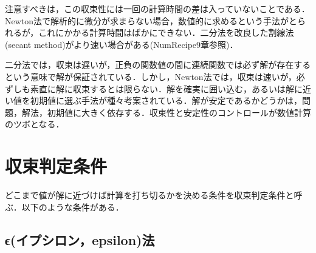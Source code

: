 \documentclass{article}
\begin{document}
\begin{maplegroup}
\begin{mapleinput}
\end{mapleinput}
\mapleresult
\begin{maplelatex}
\end{maplelatex}
\end{maplegroup}
\begin{maplegroup}
\begin{Maple Normal}{
注意すべきは，この収束性には一回の計算時間の差は入っていないことである．Newton法で解析的に微分が求まらない場合，数値的に求めるという手法がとられるが，これにかかる計算時間はばかにできない．二分法を改良した割線法(secant method)がより速い場合がある(NumRecipe9章参照)．}\end{Maple Normal}

\end{maplegroup}
\begin{maplegroup}
\begin{Maple Normal}{
二分法では，収束は遅いが，正負の関数値の間に連続関数では必ず解が存在するという意味で解が保証されている．しかし，Newton法では，収束は速いが，必ずしも素直に解に収束するとは限らない．解を確実に囲い込む，あるいは解に近い値を初期値に選ぶ手法が種々考案されている．解が安定であるかどうかは，問題，解法，初期値に大きく依存する．収束性と安定性のコントロールが数値計算のツボとなる．}\end{Maple Normal}

\end{maplegroup}
\section{\textbf{収束判定条件}}
\begin{maplegroup}
\begin{Maple Normal}{
どこまで値が解に近づけば計算を打ち切るかを決める条件を収束判定条件と呼ぶ．以下のような条件がある．}\end{Maple Normal}

\end{maplegroup}
\subsection{\textbf{ϵ(イプシロン，epsilon)法}}
\begin{maplelatex}\begin{Maple Normal}{
}\end{Maple Normal}
\end{maplelatex}
\begin{maplelatex}\begin{Maple Normal}{
}\end{Maple Normal}
\end{maplelatex}
\begin{maplelatex}\begin{Maple Normal}{
}\end{Maple Normal}
\end{maplelatex}
\end{document}

